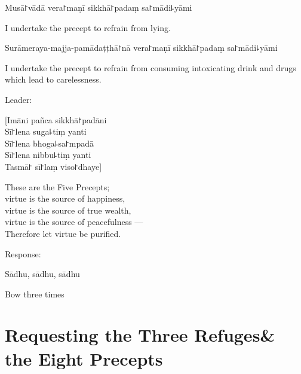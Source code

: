 \clearpage

\begin{precept}
  \setcounter{enumi}{3}
  \item Musā꜓vādā vera꜓maṇī sikkhā꜓padaṃ sa꜓mādi꜕yāmi
\end{precept}

\begin{english}
  I undertake the precept to refrain from lying.
\end{english}

\begin{precept}
  \setcounter{enumi}{4}
  \item Surāmeraya-majja-pamādaṭṭhā꜓nā vera꜓maṇī sikkhā꜓padaṃ sa꜓mādi꜕yāmi
\end{precept}

\begin{english}
  I undertake the precept to refrain from consuming intoxicating drink and drugs which lead to carelessness.
\end{english}

\begin{instruction}
  Leader:
\end{instruction}

[Imāni pañca sikkhā꜓padāni\\
Sī꜓lena suga꜕tiṃ yanti\\
Sī꜓lena bhoga꜕sa꜓mpadā\\
Sī꜓lena nibbu꜕tiṃ yanti\\
Tasmā꜓ sī꜓laṃ viso꜓dhaye]

\begin{english}
  These are the Five Precepts;\\
  virtue is the source of happiness,\\
  virtue is the source of true wealth,\\
  virtue is the source of peacefulness ---\\
  Therefore let virtue be purified.
\end{english}

\begin{instruction}
  Response:
\end{instruction}

Sādhu, sādhu, sādhu

\begin{instruction}
  Bow three times
\end{instruction}

\clearpage
\chapter[Three Refuges \& the Eight Precepts]{Requesting the Three Refuges\newline \& the Eight Precepts}%

